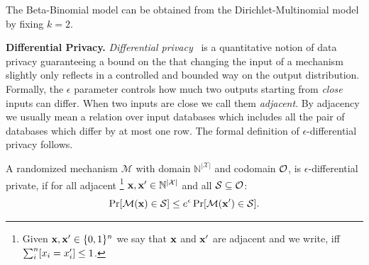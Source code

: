 \documentclass{article}
\begin{document}
%
The Beta-Binomial model can be obtained from the Dirichlet-Multinomial
model by fixing $k=2$. 



\noindent \textbf{Differential Privacy.}
\emph{Differential privacy}~\cite{dwork2006} is a quantitative notion
of data privacy guaranteeing  a bound on the that changing the input of a mechanism slightly only reflects
in a controlled and bounded way on the output distribution. 
Formally, the $\epsilon$ parameter
controls how much two outputs starting from \emph{close} inputs can differ. When two inputs are close we call them \emph{adjacent}.
By adjacency we usually mean a relation over input databases which includes all the pair of databases which differ by at most one row.
The formal definition of $\epsilon$-differential privacy follows.
\begin{definition}
\label{def_epsilon_dp}

A randomized mechanism $\mathcal{M}$ with domain $\mathbb{N}^{|\mathcal{X}|}$ and codomain $\mathcal{O}$, is $\epsilon$-differential private, if for all adjacent
\footnote{Given $\textbf{x}, \textbf{x}'\in\{0,1\}^n$  we say that $\textbf{x}$ and $\textbf{x}'$ are adjacent and we write, iff
$\sum_{i}^{n}[x_i = x'_i ]\leq 1$. } $\textbf{x}, \textbf{x}' \in \mathbb{N}^{|\mathcal{X}|}$ and all $\mathcal{S} \subseteq \mathcal{O}$:
\begin{equation*}
\Pr[\mathcal{M}(\textbf{x}) \in \mathcal{S}] \leq e^\epsilon \Pr[\mathcal{M}(\textbf{x}') \in \mathcal{S}].
\end{equation*}

\end{definition}
\end{document}
